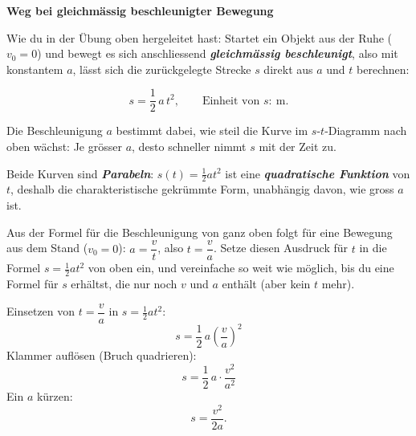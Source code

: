 \documentclass[addpoints,11pt,a4paper]{exam}
\newenvironment{theoriebox}[1][Theorie]{%
  \par\addvspace{10pt}\noindent\textbf{#1}\par\smallskip\noindent
}{%
  \par\addvspace{10pt}
}
\newlength{\antwortraumlen}
\newcommand{\Antwortraum}[1]{%
  \pgfmathsetlength{\antwortraumlen}{#1*2.5cm}%
  \begin{answerbox}
    \rule{0pt}{\antwortraumlen}%
  \end{answerbox}%
}
\begin{document}
\begin{theoriebox}[Weg bei gleichmässig beschleunigter Bewegung]
Wie du in der Übung oben hergeleitet hast: Startet ein Objekt aus der
Ruhe ($v_0=0$) und bewegt es sich anschliessend
\textbf{\emph{gleichmässig beschleunigt}}, also mit konstantem $a$, lässt
sich die zurückgelegte Strecke $s$ direkt aus $a$ und $t$ berechnen:

\begin{formelbox}
\[
  s = \frac{1}{2}\,a\,t^2, \qquad \text{Einheit von } s\colon\ \si{\meter}.
\]
\end{formelbox}

Die Beschleunigung $a$ bestimmt dabei, wie steil die Kurve im
$s$-$t$-Diagramm nach oben wächst: Je grösser $a$, desto schneller nimmt
$s$ mit der Zeit zu.

\begin{center}
\end{center}

Beide Kurven sind \textbf{\emph{Parabeln}}: $s(t)=\tfrac12 a t^2$ ist eine
\textbf{\emph{quadratische Funktion}} von $t$, deshalb die charakteristische
gekrümmte Form, unabhängig davon, wie gross $a$ ist.
\end{theoriebox}

\begin{questions}
\setcounter{question}{4}
\begin{taskbox}
\question[3] Aus der Formel für die Beschleunigung von ganz oben folgt für
eine Bewegung aus dem Stand ($v_0=0$): $a=\dfrac{v}{t}$, also
$t=\dfrac{v}{a}$. Setze diesen Ausdruck für $t$ in die Formel
$s=\tfrac12 a t^2$ von oben ein, und vereinfache so weit wie möglich, bis
du eine Formel für $s$ erhältst, die nur noch $v$ und $a$ enthält (aber
kein $t$ mehr).
\Antwortraum{3}
\begin{solution}
Einsetzen von $t=\dfrac{v}{a}$ in $s=\tfrac12 a t^2$:
\[
  s = \frac12\,a\left(\frac{v}{a}\right)^2
\]
Klammer auflösen (Bruch quadrieren):
\[
  s = \frac12\,a\cdot\frac{v^2}{a^2}
\]
Ein $a$ kürzen:
\[
  s = \frac{v^2}{2a}.
\]
\end{solution}
\end{taskbox}
\end{questions}
\end{document}
